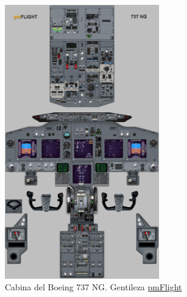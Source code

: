 \begin{figure}[!htb]
  \centering
    \includegraphics[width=0.6\textwidth]{01.tablero.instrumentos/U01.imagenes/1.2.distribucion.normalizada.instrumental.en.tablero/01-free-737-poster-HI.jpg}

  \caption{Cabina del Boeing 737 NG. Gentileza \protect\href{https://pmflight.co.uk}{pmFlight}}
  \label{fig:01.cabina.boeing.737NG}
\end{figure}

